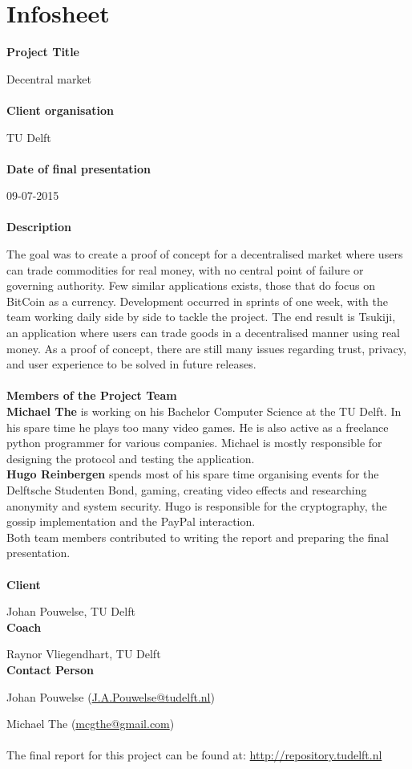 \section{Infosheet}

\textbf{Project Title}

Decentral market
\\
\\
\textbf{Client organisation}

TU Delft
\\
\\
\textbf{Date of final presentation}

09-07-2015
\\
\\
\textbf{Description}

The goal was to create a proof of concept for a decentralised market where users can trade commodities for real money, with no central point of failure or governing authority.
Few similar applications exists, those that do focus on BitCoin as a currency.
Development occurred in sprints of one week, with the team working daily side by side to tackle the project.
The end result is Tsukiji, an application where users can trade goods in a decentralised manner using real money.
As a proof of concept, there are still many issues regarding trust, privacy, and user experience to be solved in future releases.
\\
\\
\textbf{Members of the Project Team}
\\

\textbf{Michael The} is working on his Bachelor Computer Science at the TU Delft.
In his spare time he plays too many video games.
He is also active as a freelance python programmer for various companies.
Michael is mostly responsible for designing the protocol and testing the application.
\\

\textbf{Hugo Reinbergen} spends most of his spare time organising events for the Delftsche Studenten Bond, gaming, creating video effects and researching anonymity and system security.
Hugo is responsible for the cryptography, the gossip implementation and the PayPal interaction.
\\

Both team members contributed to writing the report and preparing the final presentation.
\\
\\
\textbf{Client}

Johan Pouwelse, TU Delft
\\
\textbf{Coach}

Raynor Vliegendhart, TU Delft
\\
\textbf{Contact Person}

Johan Pouwelse (\href{mailto:J.A.Pouwelse@tudelft.nl}{J.A.Pouwelse@tudelft.nl})

Michael The	(\href{mailto:mcgthe@gmail.com}{mcgthe@gmail.com})
\\
\\
The final report for this project can be found at: \url{http://repository.tudelft.nl}